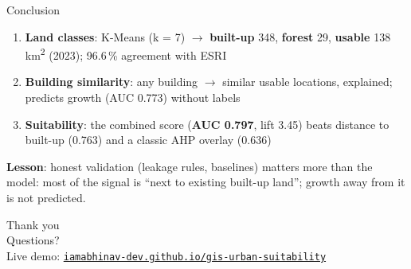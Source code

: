 \documentclass[aspectratio=169,11pt]{beamer}
\newcommand{\livelink}{\href{https://iamabhinav-dev.github.io/gis-urban-suitability/}{\texttt{iamabhinav-dev.github.io/gis-urban-suitability}}}
\newcommand{\hl}[1]{\alert{\textbf{#1}}}
\begin{document}
\begin{frame}{Conclusion}
  \small
  \begin{enumerate}
    \item \textbf{Land classes}: K-Means (k = 7) $\rightarrow$
          \textcolor{built}{\textbf{built-up}} 348, \textcolor{forest}{\textbf{forest}} 29,
          \textcolor{usable}{\textbf{usable}} 138\,km\textsuperscript{2} (2023); 96.6\,\% agreement with ESRI
    \item \textbf{Building similarity}: any building $\rightarrow$ similar usable locations,
          explained; predicts growth (AUC 0.773) without labels
    \item \textbf{Suitability}: the combined score (\hl{AUC 0.797}, lift 3.45) beats distance to
          built-up (0.763) and a classic AHP overlay (0.636)
  \end{enumerate}
  \vspace{0.5em}
  \textbf{Lesson}: honest validation (leakage rules, baselines) matters more than the model:
  most of the signal is ``next to existing built-up land''; growth away from it is not predicted.
\end{frame}

\begin{frame}[standout]
  Thank you\\[0.5em]
  \normalsize Questions?\\[1.2em]
  \footnotesize Live demo: \livelink
\end{frame}
\end{document}

